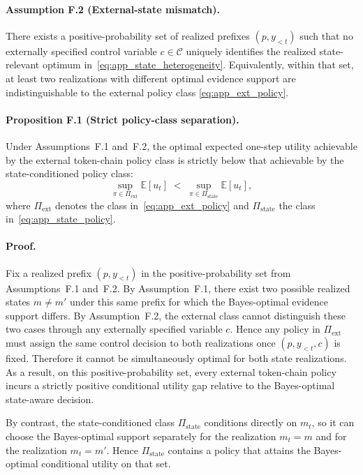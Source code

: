 \paragraph{Assumption F.2 (External-state mismatch).}
There exists a positive-probability set of realized prefixes \((p,y_{<t})\) such that no externally specified control variable \(c\in\mathcal{C}\) uniquely identifies the realized state-relevant optimum in~\eqref{eq:app_state_heterogeneity}.
Equivalently, within that set, at least two realizations with different optimal evidence support are indistinguishable to the external policy class \eqref{eq:app_ext_policy}.

\paragraph{Proposition F.1 (Strict policy-class separation).}
Under Assumptions~F.1 and~F.2, the optimal expected one-step utility achievable by the external token-chain policy class is strictly below that achievable by the state-conditioned policy class:
\begin{equation}
\sup_{\pi \in \Pi_{\mathrm{ext}}}
\mathbb{E}[u_t]
\;<\;
\sup_{\pi \in \Pi_{\mathrm{state}}}
\mathbb{E}[u_t],
\label{eq:app_policy_gap}
\end{equation}
where \(\Pi_{\mathrm{ext}}\) denotes the class in~\eqref{eq:app_ext_policy} and \(\Pi_{\mathrm{state}}\) the class in~\eqref{eq:app_state_policy}.

\paragraph{Proof.}
Fix a realized prefix \((p,y_{<t})\) in the positive-probability set from Assumptions~F.1 and~F.2.
By Assumption~F.1, there exist two possible realized states \(m\neq m'\) under this same prefix for which the Bayes-optimal evidence support differs.
By Assumption~F.2, the external class cannot distinguish these two cases through any externally specified variable \(c\).
Hence any policy in \(\Pi_{\mathrm{ext}}\) must assign the same control decision to both realizations once \((p,y_{<t},c)\) is fixed.
Therefore it cannot be simultaneously optimal for both state realizations.
As a result, on this positive-probability set, every external token-chain policy incurs a strictly positive conditional utility gap relative to the Bayes-optimal state-aware decision.

By contrast, the state-conditioned class \(\Pi_{\mathrm{state}}\) conditions directly on \(m_t\), so it can choose the Bayes-optimal support separately for the realization \(m_t=m\) and for the realization \(m_t=m'\).
Hence \(\Pi_{\mathrm{state}}\) contains a policy that attains the Bayes-optimal conditional utility on that set.

